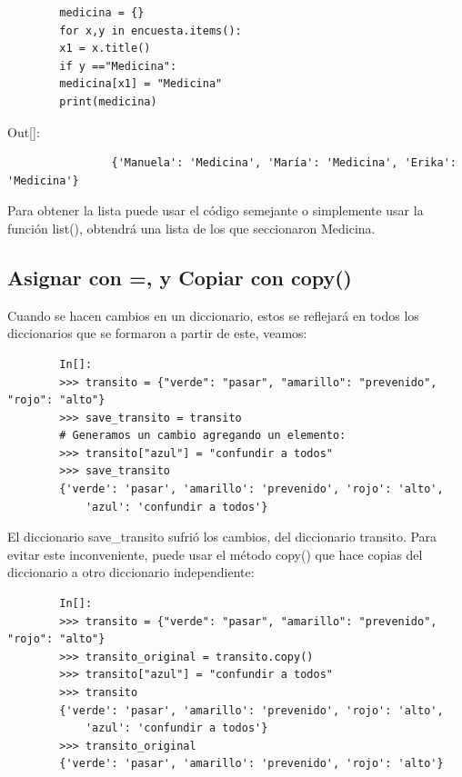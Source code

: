 	\hspace{-2.5cm}{\ttfamily \scriptsize medicina.py}  \vspace{-0.5cm}
	\begin{lstlisting}
		medicina = {}
		for x,y in encuesta.items():
		x1 = x.title()
		if y =="Medicina":
		medicina[x1] = "Medicina"
		print(medicina)  
	\end{lstlisting}	
	{\ttfamily\scriptsize\scriptsize 
		\hspace{-0.0cm} Out[]:\vspace{-0.3cm}	
		{\color{blue} 	
			\begin{verbatim}
				{'Manuela': 'Medicina', 'María': 'Medicina', 'Erika': 'Medicina'}
			\end{verbatim}
	}}
	Para obtener la lista puede usar el código semejante o simplemente usar la función {\ttfamily list()}, obtendrá una lista de los que seccionaron Medicina. 
	
	
	
	
	\subsection{Asignar con =, y Copiar con copy()}
	
	Cuando se hacen cambios en un diccionario, estos se reflejará en todos los diccionarios que se formaron a partir de este, veamos:
	
	\begin{lstlisting}
		In[]:	
		>>> transito = {"verde": "pasar", "amarillo": "prevenido", "rojo": "alto"}
		>>> save_transito = transito
		# Generamos un cambio agregando un elemento:
		>>> transito["azul"] = "confundir a todos"
		>>> save_transito
		{'verde': 'pasar', 'amarillo': 'prevenido', 'rojo': 'alto', 
			'azul': 'confundir a todos'}
	\end{lstlisting}
	
	\noindent El diccionario {\ttfamily save\_transito} sufrió los cambios, del diccionario  {\ttfamily transito}.  Para evitar este inconveniente, puede usar el método {\ttfamily copy()} que hace  copias del diccionario a otro diccionario independiente:
	
	\begin{lstlisting}
		In[]:	
		>>> transito = {"verde": "pasar", "amarillo": "prevenido", "rojo": "alto"}
		>>> transito_original = transito.copy()
		>>> transito["azul"] = "confundir a todos"
		>>> transito
		{'verde': 'pasar', 'amarillo': 'prevenido', 'rojo': 'alto',
			'azul': 'confundir a todos'}
		>>> transito_original
		{'verde': 'pasar', 'amarillo': 'prevenido', 'rojo': 'alto'}
	\end{lstlisting}
	
